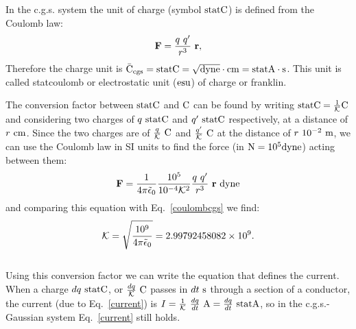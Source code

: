 \documentclass[12pt,a4paper,twoside]{report}
\def\kappa{2.99792458082\times 10^{9}}
\begin{document}
{{\color{orange} In the c.g.s. system the unit of charge (symbol ${\rm statC}$)
is defined from the Coulomb law:
\begin{equation}
{\bf F} = {q\ q'\over r^3}\ {\bf r},
\label{coulombcgs}
\end{equation}
Therefore the charge unit is ${\rm \bar C_{cgs}}={\rm statC}=\sqrt{{\rm dyne}}\cdot {\rm cm}=
{\rm statA}\cdot {\rm s}$. This unit is called statcoulomb 
or electrostatic unit (${\rm esu}$) of charge or franklin.

The conversion factor between ${\rm statC}$ and ${\rm C}$ can be found by 
writing
${\rm statC}={1\over \mathcal{K}} {\rm C}$ and considering two charges of 
$q\ {\rm statC}$ and 
$q'\ {\rm statC}$ respectively, at a distance of $r\ {\rm cm}$. Since the two charges are
of ${q\over \mathcal{K}}\ {\rm C}$ and ${q'\over \mathcal{K}}\ {\rm C}$ at the distance of $r\ 10^{-2}\ {\rm m}$,
we can use the Coulomb law in SI units to find 
the force (in ${\rm N}=10^5 {\rm dyne}$) acting between them: 
\begin{equation}
{\bf F}={1\over 4 \pi \tilde \epsilon_0} {10^5\over 10^{-4} \mathcal{K}^2} 
{q\ q'\over r^3}\ {\bf r}\ {\rm dyne}
\end{equation}
and comparing this equation with Eq.~\ref{coulombcgs} we find:
\begin{equation}
\mathcal{K}= \sqrt{10^9 \over 4 \pi \tilde \epsilon_0}= \kappa. 
\end{equation}
\\
Using this conversion factor we can write the equation that defines 
the current. When a charge $dq\ {\rm statC}$, or ${dq\over \mathcal{K}}\ 
{\rm C}$ passes in $dt\ {\rm s}$
through a section of a conductor, the current (due to Eq.~\ref{current})
is $I={1\over \mathcal{K}}\ {dq\over dt}\ {\rm A}= {dq\over dt}\ {\rm statA}$,
so in the 
c.g.s.-Gaussian system Eq.~\ref{current} still holds.   
}
\\


}
\end{document}
